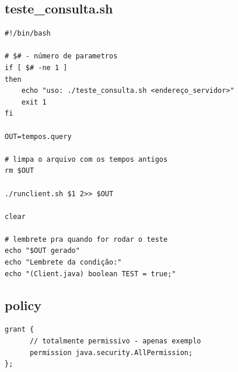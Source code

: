 \documentclass[11pt,twoside]{article}
\begin{document}
\subsection{teste_consulta.sh}      %
\begin{verbatim}
#!/bin/bash

# $# - número de parametros 
if [ $# -ne 1 ]
then
    echo "uso: ./teste_consulta.sh <endereço_servidor>"
    exit 1
fi

OUT=tempos.query

# limpa o arquivo com os tempos antigos
rm $OUT

./runclient.sh $1 2>> $OUT

clear

# lembrete pra quando for rodar o teste
echo "$OUT gerado"
echo "Lembrete da condição:"
echo "(Client.java) boolean TEST = true;"

\end{verbatim}


\subsection{policy}       %
\begin{verbatim}
grant {
      // totalmente permissivo - apenas exemplo
      permission java.security.AllPermission;
};
\end{verbatim}


\end{document}
